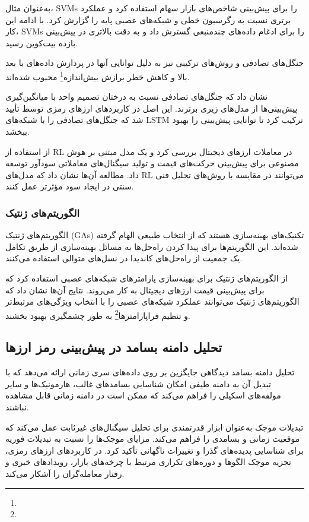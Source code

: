 {به‌عنوان مثال، \cite{guresen2011using} SVMs را برای پیش‌بینی شاخص‌های بازار سهام استفاده کرد و عملکرد برتری نسبت به رگرسیون خطی و شبکه‌های عصبی پایه را گزارش کرد. با ادامه این کار، \cite{chen2020cryptocurrency} SVMs را برای ادغام داده‌های چندمنبعی گسترش داد و به دقت بالاتری در پیش‌بینی بازده بیت‌کوین رسید.


جنگل‌های تصادفی و روش‌های ترکیبی نیز به دلیل توانایی آنها در پردازش داده‌های با بعد بالا و کاهش خطر برازش بیش‌اندازه\footnote{} محبوب شده‌اند. 

\cite{breiman2001random} نشان داد که جنگل‌های تصادفی نسبت به درختان تصمیم واحد با میانگین‌گیری پیش‌بینی‌ها از مدل‌های زیری برترند. این اصل در کاربردهای ارزهای رمزی توسط \cite{wang2021ensemble} تأیید شد که جنگل‌های تصادفی را با شبکه‌های LSTM ترکیب کرد تا توانایی پیش‌بینی را بهبود ببخشد.


\cite{author6} از استفاده از RL در معاملات ارزهای دیجیتال بررسی کرد و یک مدل مبتنی بر هوش مصنوعی برای پیش‌بینی حرکت‌های قیمت و تولید سیگنال‌های معاملاتی سودآور توسعه داد. مطالعه آن‌ها نشان داد که مدل‌های RL می‌توانند در مقایسه با روش‌های تحلیل فنی سنتی در ایجاد سود مؤثرتر عمل کنند.

\subsubsection{الگوریتم‌های ژنتیک}
الگوریتم‌های ژنتیک (GAs) تکنیک‌های بهینه‌سازی هستند که از انتخاب طبیعی الهام گرفته شده‌اند. این الگوریتم‌ها برای پیدا کردن راه‌حل‌ها به مسائل بهینه‌سازی از طریق تکامل یک جمعیت از راه‌حل‌های کاندیدا در نسل‌های متوالی استفاده می‌کنند.

\cite{author7} از الگوریتم‌های ژنتیک برای بهینه‌سازی پارامترهای شبکه‌های عصبی استفاده کرد که برای پیش‌بینی قیمت ارزهای دیجیتال به کار می‌روند. نتایج آن‌ها نشان داد که الگوریتم‌های ژنتیک می‌توانند عملکرد شبکه‌های عصبی را با انتخاب ویژگی‌های مرتبط‌تر و تنظیم فراپارامتر‌ها\footnote{} به طور چشمگیری بهبود بخشند.


\subsection{تحلیل دامنه بسامد در پیش‌بینی رمز ارز‌ها}
تحلیل دامنه بسامد دیدگاهی جایگزین بر روی داده‌های سری زمانی ارائه می‌دهد که با تبدیل آن به دامنه طیفی امکان شناسایی بسامدهای غالب، هارمونیک‌ها و سایر مولفه‌های اسکیلی را فراهم می‌کند که ممکن است در دامنه زمانی قابل مشاهده نباشند.


تبدیلات موجک به‌عنوان ابزار قدرتمندی برای تحلیل سیگنال‌های غیرثابت عمل می‌کند که موقعیت زمانی و بسامدی را فراهم می‌کند. \cite{percival2000wavelet} مزایای موجک‌ها را نسبت به تبدیلات فوریه برای شناسایی پدیده‌های گذرا و تغییرات ناگهانی تأکید کرد. در کاربردهای ارزهای رمزی، تجزیه موجک الگوها و دوره‌های تکراری مرتبط با چرخه‌های بازار، رویدادهای خبری و رفتار معامله‌گران را آشکار می‌کند.


}
